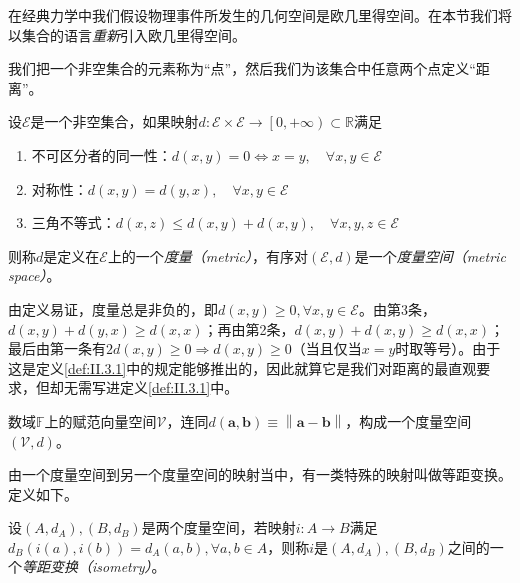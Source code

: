 \documentclass[main.tex]{subfiles}
\begin{document}
在经典力学中我们假设物理事件所发生的几何空间是欧几里得空间。在本节我们将以集合的语言\emph{重新}引入欧几里得空间。

我们把一个非空集合的元素称为“点”，然后我们为该集合中任意两个点定义“距离”。

\begin{definition}[度量空间]\label{def:II.3.1}
    设$\mathcal{E}$是一个非空集合，如果映射$d:\mathcal{E}\times\mathcal{E}\rightarrow\left[0,+\infty\right)\subset\mathbb{R}$满足
    \begin{enumerate}
        \item 不可区分者的同一性：$d\left(x,y\right)=0\Leftrightarrow x=y,\quad\forall x,y\in\mathcal{E}$
        \item 对称性：$d\left(x,y\right)=d\left(y,x\right),\quad\forall x,y\in\mathcal{E}$
        \item 三角不等式：$d\left(x,z\right)\leq d\left(x,y\right)+d\left(x,y\right),\quad\forall x,y,z\in\mathcal{E}$
    \end{enumerate}
    则称$d$是定义在$\mathcal{E}$上的一个\emph{度量（metric）}，有序对$\left(\mathcal{E},d\right)$是一个\emph{度量空间（metric space）}。
\end{definition}

由定义易证，度量总是非负的，即$d\left(x,y\right)\geq0,\forall x,y\in\mathcal{E}$。由第3条，$d\left(x,y\right)+d\left(y,x\right)\geq d\left(x,x\right)$；再由第2条，$d\left(x,y\right)+d\left(x,y\right)\geq d\left(x,x\right)$；最后由第一条有$2d\left(x,y\right)\geq0\Rightarrow d\left(x,y\right)\geq0$（当且仅当$x=y$时取等号）。由于这是定义\ref{def:II.3.1}中的规定能够推出的，因此就算它是我们对距离的最直观要求，但却无需写进定义\ref{def:II.3.1}中。

\begin{example}\label{exp:II.3.1}
    数域$\mathbb{F}$上的赋范向量空间$\mathcal{V}$，连同$d\left(\mathbf{a},\mathbf{b}\right)\equiv\left\|\mathbf{a}-\mathbf{b}\right\|$，构成一个度量空间$\left(\mathcal{V},d\right)$。
\end{example}

由一个度量空间到另一个度量空间的映射当中，有一类特殊的映射叫做等距变换。定义如下。

\begin{definition}[等距变换]\label{def:II.3.2}
    设$\left(A,d_A\right),\left(B,d_B\right)$是两个度量空间，若映射$i:A\rightarrow B$满足$d_B\left(i\left(a\right),i\left(b\right)\right)=d_A\left(a,b\right),\forall a,b\in A$，则称$i$是$\left(A,d_A\right),\left(B,d_B\right)$之间的一个\emph{等距变换（isometry）}。
\end{definition}
\end{document}
